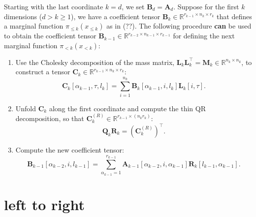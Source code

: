 \begin{prop}
	Starting with the last coordinate $k = d$, we set $\bm{B}_d = \bm{A}_d$. Suppose for the first $k$ dimensions ($d > k\geq  1$), we have a coefficient tensor $\bm{B}_k \in \mathbb{R}^{r_{k-1} \times n_k \times r_k}$ that defines a marginal function $\pi_{\leq k}(x_{\leq k})$ as in (??). The following procedure \textbf{can} be used to obtain the coefficient tensor $\bm{B}_{k-1} \in \mathbb{R}^{r_{k-2} \times n_{k-1} \times r_{k-1}}$ for defining the next marginal function $\pi_{<k}(x_{<k})$:
	\begin{enumerate}
		\item Use the Cholesky decomposition of the mass matrix, $\bm{L}_k \bm{L}_k^\top = \bm{M}_k \in \mathbb{R}^{n_k \times n_k}$, to construct a tensor $\bm{C}_k \in \mathbb{R}^{r_{k-1} \times n_k \times r_k}$:
		\begin{equation}
			\bm{C}_k[\alpha_{k-1}, \tau, l_k] = \sum_{i=1}^{n_k} \bm{B}_k[\alpha_{k-1}, i, l_k] \bm{L}_k[i, \tau].
		\end{equation}
		\item Unfold $\bm{C}_k$ along the first coordinate and compute the thin QR decomposition, so that $\bm{C}_k^{(R)} \in \mathbb{R}^{r_{k-1} \times (n_k r_k)}$:
		\begin{equation}
			\bm{Q}_k \bm{R}_k = {(\bm{C}_k^{(R)})}^{\top}.
		\end{equation}
		\item Compute the new coefficient tensor:
		\begin{equation}
			\bm{B}_{k-1}[\alpha_{k-2}, i, l_{k-1}] = \sum_{\alpha_{k-1}=1}^{r_{k-1}} \bm{A}_{k-1}[\alpha_{k-2}, i, \alpha_{k-1}] \bm{R}_k[l_{k-1}, \alpha_{k-1}].
		\end{equation}
	\end{enumerate}
\end{prop}





\section{left to right}

